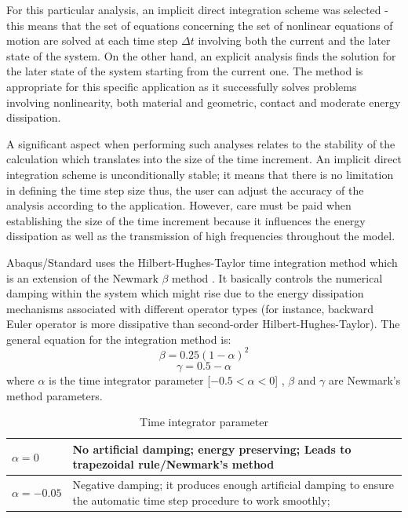 \documentclass[12pt,a4paper]{report}
\begin{document}
For this particular analysis, an implicit direct integration scheme was selected - this means that the set of equations concerning the set of nonlinear equations of motion are solved at each time step $\Delta t$ involving both the current and the later state of the system. On the other hand, an explicit analysis finds the solution for the later state of the system starting from the current one. The method is appropriate for this specific application as it successfully solves problems involving nonlinearity, both material and geometric, contact and moderate energy dissipation. 

A significant aspect when performing such analyses relates to the stability of the calculation which translates into the size of the time increment. An implicit direct integration scheme is unconditionally stable; it means that there is no limitation in defining the time step size thus, the user can adjust the accuracy of the analysis according to the application. However, care must be paid when establishing the size of the time increment because it influences the energy dissipation as well as the transmission of high frequencies throughout the model.

Abaqus/Standard uses the Hilbert-Hughes-Taylor time integration method which is an extension of the Newmark $\beta$ method \cite{newmark1959method}. It basically controls the numerical damping within the system which might rise due to the energy dissipation mechanisms associated with different operator types (for instance, backward Euler operator is more dissipative than second-order Hilbert-Hughes-Taylor). The general equation for the integration method is:
\begin{equation}
	\beta=0.25(1-\alpha)^2
\end{equation}
\begin{equation}
	\gamma= 0.5-\alpha
\end{equation}
where $\alpha$ is the time integrator parameter [$-0.5<\alpha<0$] , $\beta$ and $\gamma$ are Newmark's method parameters.

\begin{table}[h!]
	\centering
	\begin{tabular}{|p{2cm}|p{10cm}|}
		\hline $\alpha=0$       &      No artificial damping; energy preserving;
		Leads to trapezoidal rule/Newmark's method \\
		\hline $\alpha=-0.05$ & Negative damping; it produces enough artificial damping to ensure the automatic time step procedure to work smoothly; \\
		\hline
	\end{tabular}
	\caption{Time integrator parameter}
\end{table}
\end{document}
